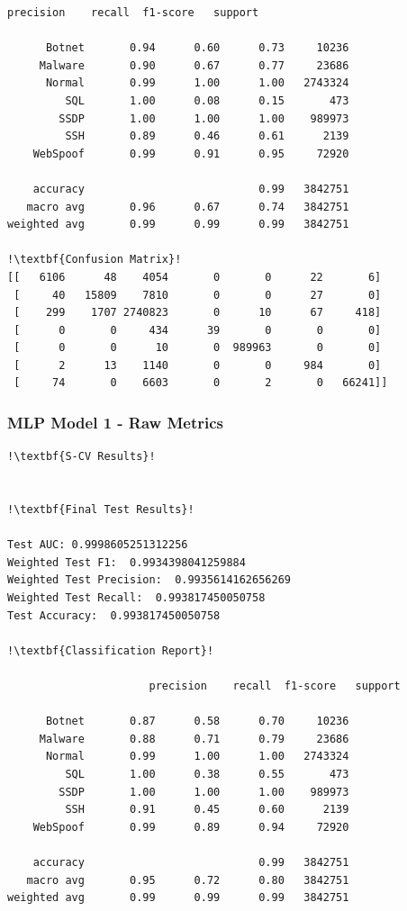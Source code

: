 \begin{appendices}
\begin{lstlisting}[escapechar=!]
			          precision    recall  f1-score   support

      Botnet       0.94      0.60      0.73     10236
     Malware       0.90      0.67      0.77     23686
      Normal       0.99      1.00      1.00   2743324
         SQL       1.00      0.08      0.15       473
        SSDP       1.00      1.00      1.00    989973
         SSH       0.89      0.46      0.61      2139
    WebSpoof       0.99      0.91      0.95     72920

    accuracy                           0.99   3842751
   macro avg       0.96      0.67      0.74   3842751
weighted avg       0.99      0.99      0.99   3842751
    
!\textbf{Confusion Matrix}!    
[[   6106      48    4054       0       0      22       6]
 [     40   15809    7810       0       0      27       0]
 [    299    1707 2740823       0      10      67     418]
 [      0       0     434      39       0       0       0]
 [      0       0      10       0  989963       0       0]
 [      2      13    1140       0       0     984       0]
 [     74       0    6603       0       2       0   66241]]

\end{lstlisting}


\subsubsection{MLP Model 1 - Raw Metrics}
\begin{lstlisting}[escapechar=!]
!\textbf{S-CV Results}!


!\textbf{Final Test Results}!

Test AUC: 0.9998605251312256
Weighted Test F1:  0.9934398041259884
Weighted Test Precision:  0.9935614162656269
Weighted Test Recall:  0.993817450050758
Test Accuracy:  0.993817450050758

!\textbf{Classification Report}!

			          precision    recall  f1-score   support

      Botnet       0.87      0.58      0.70     10236
     Malware       0.88      0.71      0.79     23686
      Normal       0.99      1.00      1.00   2743324
         SQL       1.00      0.38      0.55       473
        SSDP       1.00      1.00      1.00    989973
         SSH       0.91      0.45      0.60      2139
    WebSpoof       0.99      0.89      0.94     72920

    accuracy                           0.99   3842751
   macro avg       0.95      0.72      0.80   3842751
weighted avg       0.99      0.99      0.99   3842751
    

\end{lstlisting}
\end{appendices}
